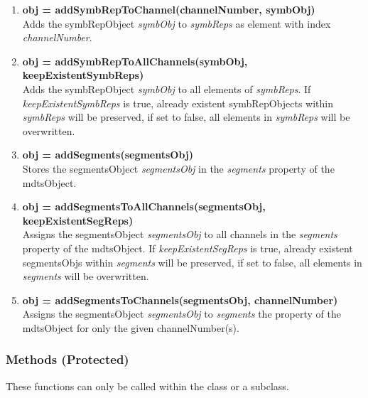 \documentclass[a4]{scrreprt}
\begin{document}
\begin{enumerate}
\item \textbf{obj = addSymbRepToChannel(channelNumber, symbObj)}\\
	Adds the symbRepObject \textit{symbObj} to \textit{symbReps} as element with index \textit{channelNumber}.
	
\item \textbf{obj = addSymbRepToAllChannels(symbObj, keepExistentSymbReps)}\\
Adds the symbRepObject \textit{symbObj} to all elements of \textit{symbReps}. If \textit{keepExistentSymbReps} is true, already existent symbRepObjects within \textit{symbReps} will be preserved, if set to false, all elements in \textit{symbReps} will be overwritten.

\item \textbf{obj = addSegments(segmentsObj)}\\
Stores the segmentsObject \textit{segmentsObj} in the \textit{segments} property of the mdtsObject.

\item \textbf{obj = addSegmentsToAllChannels(segmentsObj, keepExistentSegReps)}\\
Assigns the segmentsObject \textit{segmentsObj} to all channels in the \textit{segments} property of the mdtsObject. If \textit{keepExistentSegReps} is true, already existent segmentsObjs within \textit{segments} will be preserved, if set to false, all elements in \textit{segments} will be overwritten.

\item \textbf{obj = addSegmentsToChannels(segmentsObj, channelNumber)}\\
Assigns the segmentsObject \textit{segmentsObj} to  \textit{segments} the property of the mdtsObject for only the given channelNumber(s).

\end{enumerate}

\subsubsection{Methods (Protected)}
These functions can only be called within the class or a subclass.
\end{document}
